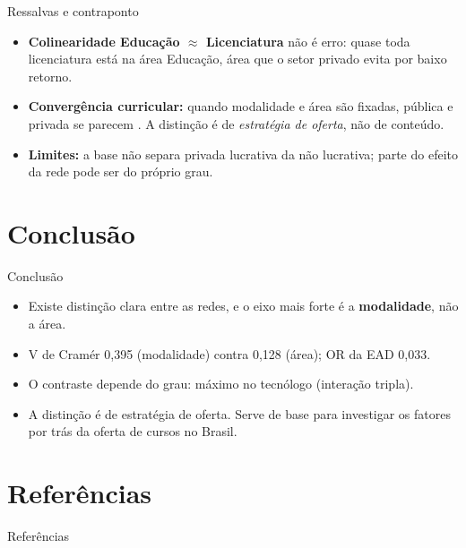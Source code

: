 \documentclass{beamer}
\begin{document}
\begin{frame}{Ressalvas e contraponto}
  \begin{itemize}
    \item \textbf{Colinearidade Educação $\approx$ Licenciatura} não é erro: quase toda licenciatura está na área Educação, área que o setor privado evita por baixo retorno.
    \item \textbf{Convergência curricular:} quando modalidade e área são fixadas, pública e privada se parecem \parencite{schonarth2016cstgq}. A distinção é de \emph{estratégia de oferta}, não de conteúdo.
    \item \textbf{Limites:} a base não separa privada lucrativa da não lucrativa; parte do efeito da rede pode ser do próprio grau.
  \end{itemize}
\end{frame}

\section{Conclusão}

\begin{frame}{Conclusão}
  \begin{itemize}
    \item Existe distinção clara entre as redes, e o eixo mais forte é a \textbf{modalidade}, não a área.
    \item V de Cramér 0,395 (modalidade) contra 0,128 (área); OR da EAD 0,033.
    \item O contraste depende do grau: máximo no tecnólogo (interação tripla).
    \item A distinção é de estratégia de oferta. Serve de base para investigar os fatores por trás da oferta de cursos no Brasil.
  \end{itemize}
\end{frame}

\section{Referências}

\begin{frame}[allowframebreaks]{Referências}
  \tiny
  \printbibliography[heading=none]
\end{frame}
\end{document}
